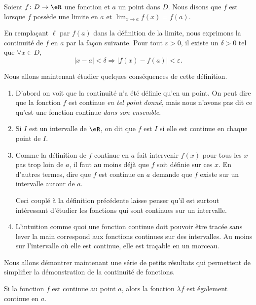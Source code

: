 \begin{definition}		\label{DefFonctContinueRR}
	Soient $f\colon D\to \eR$ une fonction et $a$ un point dans $D$. Nous disons que $f$ est  lorsque $f$ possède une limite en $a$ et $\lim_{x\to a} f(x)=f(a)$.
\end{definition}
En remplaçant $\ell$ par $f(a)$ dans la définition de la limite, nous exprimons la continuité de $f$ en $a$ par la façon suivante. Pour tout $\varepsilon>0$, il existe un $\delta>0$ tel que $\forall x\in D$,
\begin{equation}
	| x-a |<\delta\Rightarrow \big| f(x)-f(a) \big|<\varepsilon.
\end{equation}


Nous allons maintenant étudier quelques conséquences de cette définition.

\begin{enumerate}
\item D'abord on voit que la continuité n'a été définie qu'en un point. On peut dire que la fonction $f$ est continue \emph{en tel point donné}, mais nous n'avons pas dit ce qu'est une fonction continue \emph{dans son ensemble}.

\item Si $I$ est un intervalle de $\eR$, on dit que $f$ est  $I$ si elle est continue en chaque point de $I$.

\item Comme la définition de $f$ continue en $a$ fait intervenir $f(x)$ pour tous les $x$ pas trop loin de $a$, il faut au moins déjà que $f$ soit définie sur ces $x$. En d'autres termes, dire que $f$ est continue en $a$ demande que $f$ existe sur un intervalle autour de $a$.

Ceci couplé à la définition précédente laisse penser qu'il est surtout intéressant d'étudier les fonctions qui sont continues sur un intervalle.

\item L'intuition comme quoi une fonction continue doit pouvoir être tracée sans lever la main correspond aux fonctions continues sur des intervalles. Au moins sur l'intervalle où elle est continue, elle est traçable en un morceau.
\end{enumerate}


Nous allons démontrer maintenant une série de petits résultats qui permettent de simplifier la démonstration de la continuité de fonctions.
\begin{theorem}
Si la fonction $f$ est continue au point $a$, alors la fonction $\lambda f$ est également continue en $a$.
\end{theorem}

